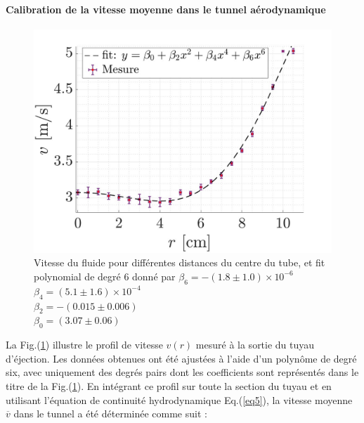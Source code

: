 \documentclass[a4paper, 12pt,oneside]{article}
\begin{document}
\vspace{-0.25cm}

\paragraph{Calibration de la vitesse moyenne dans le tunnel aérodynamique}  

\begin{figure}
    
    \vspace{-1.5cm}
    \centering
    \includegraphics[width=1\linewidth]{fig1re.jpg}
    \captionsetup{justification=centering}
    \caption{Vitesse du fluide pour différentes distances du centre du tube, et fit polynomial de degré 6 donné par $\beta_6 = - (1.8\pm1.0) \times 10^{-6}$ \\
    $\beta_4 = (5.1\pm1.6) \times 10^{-4}$\\
    $\beta_2 = - (0.015\pm0.006)$ \\
    $\beta_0 = (3.07\pm0.06)$}
    \label{fig1re}
\end{figure}

La Fig.(\ref{fig1re}) illustre le profil de vitesse $v(r)$ mesuré à la sortie du tuyau d’éjection. Les données obtenues ont été ajustées à l’aide d’un polynôme de degré six, avec uniquement des degrés pairs dont les coefficients sont représentés dans le titre de la Fig.(\ref{fig1re}). En intégrant ce profil sur toute la section du tuyau et en utilisant l’équation de continuité hydrodynamique Eq.(\ref{eq5}), la vitesse moyenne $\overline{v}$ dans le tunnel a été déterminée comme suit :  
\end{document}

